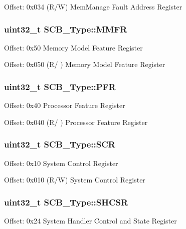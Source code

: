 Offset\-: 0x034 (R/\-W) Mem\-Manage Fault Address Register \hypertarget{struct_s_c_b___type_a40b4fec8c296cba02baec983378cbcfd}{
\subsubsection[{M\-M\-F\-R}]{ uint32\-\_\-t S\-C\-B\-\_\-\-Type\-::\-M\-M\-F\-R}}\label{struct_s_c_b___type_a40b4fec8c296cba02baec983378cbcfd}
Offset\-: 0x50 Memory Model Feature Register

Offset\-: 0x050 (R/ ) Memory Model Feature Register \hypertarget{struct_s_c_b___type_aeb36c109d2fdb4eb4d6c4dc29154d77f}{
\subsubsection[{P\-F\-R}]{ uint32\-\_\-t S\-C\-B\-\_\-\-Type\-::\-P\-F\-R}}\label{struct_s_c_b___type_aeb36c109d2fdb4eb4d6c4dc29154d77f}
Offset\-: 0x40 Processor Feature Register

Offset\-: 0x040 (R/ ) Processor Feature Register \hypertarget{struct_s_c_b___type_abfad14e7b4534d73d329819625d77a16}{
\subsubsection[{S\-C\-R}]{ uint32\-\_\-t S\-C\-B\-\_\-\-Type\-::\-S\-C\-R}}\label{struct_s_c_b___type_abfad14e7b4534d73d329819625d77a16}
Offset\-: 0x10 System Control Register

Offset\-: 0x010 (R/\-W) System Control Register \hypertarget{struct_s_c_b___type_ae9891a59abbe51b0b2067ca507ca212f}{
\subsubsection[{S\-H\-C\-S\-R}]{ uint32\-\_\-t S\-C\-B\-\_\-\-Type\-::\-S\-H\-C\-S\-R}}\label{struct_s_c_b___type_ae9891a59abbe51b0b2067ca507ca212f}
Offset\-: 0x24 System Handler Control and State Register

